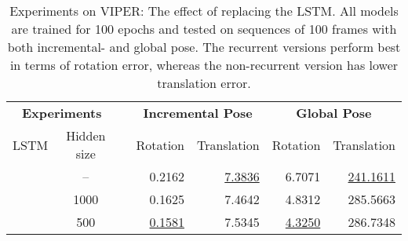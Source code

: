 		\begin{table}[tb]
			\small
			\begin{center}
				\begin{tabular}{cccrrrr}
					\toprule
					\multicolumn{2}{c}{\textbf{Experiments}} & & \multicolumn{2}{c}{\textbf{Incremental Pose}} & \multicolumn{2}{c}{\textbf{Global Pose}} \\
					LSTM 	& Hidden size 		& 	& Rotation 	& Translation & Rotation & Translation \\
					\midrule
					\xmark	& -- 				&	& 0.2162	& \underline{7.3836}	& 6.7071	& \underline{241.1611}		\\
					\cmark	& 1000				& 	& 0.1625	&	7.4642 	& 4.8312&	285.5663		\\
					\cmark 	& 500				& 	&\underline{0.1581}	& 7.5345 	& \underline{4.3250}&	286.7348	 \\
					\bottomrule
				\end{tabular}
			\end{center}
			\caption[Experiments on VIPER: The effect of replacing the LSTM]
					{Experiments on VIPER: The effect of replacing the LSTM.
					 All models are trained for 100 epochs and tested on sequences of 100 frames with both incremental- and global pose.
					 The recurrent versions perform best in terms of rotation error, whereas the non-recurrent version has lower translation error.
					 \label{tbl:viper-effect-of-replacing-LSTM}}
		\end{table}
		

